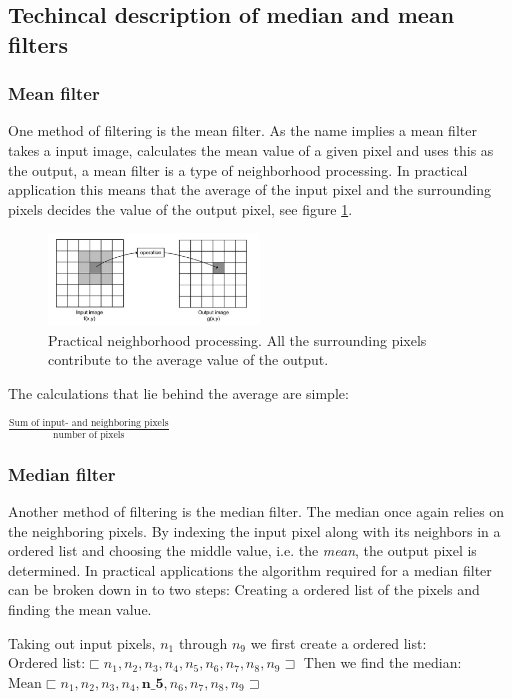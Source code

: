 \subsection{Techincal description of median and mean filters}

\subsubsection{Mean filter}
One method of filtering is the mean filter. As the name implies a mean filter takes a input image, calculates the mean value of a given pixel and uses this as the output, a mean filter is a type of neighborhood processing. In practical application this means that the average of the input pixel and the surrounding pixels decides the value of the output pixel, see figure \ref{fig:neigh_pros}.

\begin{figure}[htbp] 
\centering 
\includegraphics[width=0.5\textwidth]{Pictures/Theory/neighborhood_processing.png} 
\caption{Practical neighborhood processing. All the surrounding pixels contribute to the average value of the output.} 
\label{fig:neigh_pros} 
\end{figure}

The calculations that lie behind the average are simple:

$
\frac{\text{Sum of input- and neighboring pixels}}{\text{number of pixels}}
$

\subsubsection{Median filter}
Another method of filtering is the median filter. The median once again relies on the neighboring pixels. By indexing the input pixel along with its neighbors in a ordered list and choosing the middle value, i.e. the \textit{mean}, the output pixel is determined. In practical applications the algorithm required for a median filter can be broken down in to two steps: Creating a ordered list of the pixels and finding the mean value.

Taking out input pixels, $n_1$ through $n_9$ we first create a ordered list:
$
\text{Ordered list:}\sqsubset n_1,n_2,n_3,n_4,n_5,n_6,n_7,n_8,n_9 \sqsupset
$
Then we find the median:
$
\text{Mean}\sqsubset n_1,n_2,n_3,n_4,\textbf{n_5},n_6,n_7,n_8,n_9 \sqsupset
$
